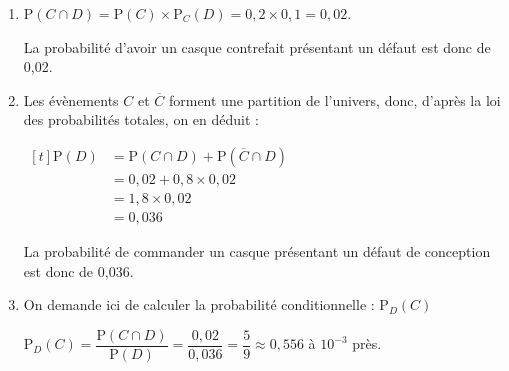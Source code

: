 \documentclass[10pt]{article}
\begin{document}
\begin{enumerate}
\item 	$\mathrm{P}(C\cap D) = \mathrm{P}(C) \times \mathrm{P}_C(D) = 0,2 \times 0,1 = 0,02$.

La probabilité d'avoir un casque contrefait présentant un défaut est donc de 0,02.

\item Les évènements $C$ et $\overline{C}$ forment une partition de l'univers, donc, d'après la loi des probabilités totales, on en déduit :

$\begin{aligned}[t] \mathrm{P}(D) &= \mathrm{P}(C \cap D) + \mathrm{P}\left(\overline{C} \cap D\right)\\
&= 0,02 + 0,8 \times 0,02\\
&= 1,8 \times 0,02\\
&= 0,036\end{aligned}$

La probabilité de commander un casque présentant un défaut de conception est donc de 0,036.
\item On demande ici de calculer la probabilité conditionnelle : $\mathrm{P}_D(C)$

$\mathrm{P}_D(C) = \dfrac{\mathrm{P}(C \cap D)}{\mathrm{P}(D)} = \dfrac{0,02}{0,036} = \dfrac{5}{9} \approx 0,556$ à $10^{-3}$ près.
\end{enumerate}

\medskip
\end{document}
